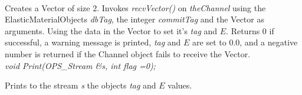 \\
Creates a Vector of size $2$. Invokes {\em recvVector()} on  {\em
theChannel} using the ElasticMaterialObjects {\em dbTag}, the integer
{\em commitTag} and the Vector as arguments. Using the data in the
Vector to set it's {\em tag} and $E$. Returns $0$ if successful, a
warning message is printed, {\em tag} and $E$ are set to $0.0$, and a
negative number is returned if the Channel object fails to receive
the Vector. \\

{\em    void Print(OPS_Stream \&s, int flag =0);} 

Prints to the stream {\em s} the objects {\em tag} and $E$ values. \\

